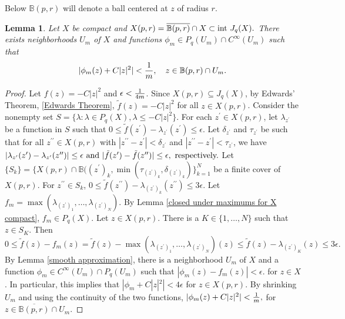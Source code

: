 \documentclass[12pt]{amsart}
\newtheorem{lem}[theorem]{Lemma}
\numberwithin{equation}{section}
{\theoremstyle{definition}
\newtheorem{remark}[theorem]{Remark}
}
\begin{document}
Below $\mathbb{B}(p, r)$ will denote a ball centered at $z$ of radius $r$.
\begin{lem}\label{A Pq function which is close on the Jensen boundary}
    Let $X$ be compact and
$
X(p, r) = \overline{\mathbb{B}(p, r)} \cap X \subset \hbox{int }J_q(X).
$
There exists neighborhoods $U_m$ of $X$ and functions $\phi_m \in P_q(U_m) \cap C^{\infty}(U_m)$ such that
$$
|\phi_m(z) + C|z|^2| < {1 \over m}, \quad z \in \mathbb{B}(p, r) \cap U_m.
$$
\end{lem}
\begin{proof}
Let $f(z) = -C|z|^2$ and $\epsilon < {1 \over 4m}$. Since $X(p, r) \subseteq J_q(X)$, by Edwards' Theorem, \eqref{Edwards Theorem}, 
$
\tilde{f}(z) = -C|z|^2$ for all $z \in X(p, r)$.
Consider the nonempty set
$
S = \{\lambda: \lambda \in P_q(X), \lambda \leq -C|z|^2\}.
$
For each $z^{\prime} \in X(p, r)$, let $\lambda_{z^{\prime}}$ be a function in $S$ such that
$
0 \leq \tilde{f}(z^{\prime}) - \lambda_{z^{\prime}}(z^{\prime}) \leq \epsilon.
$
 Let $\delta_{z^{\prime}}$ and $\tau_{z^{\prime}}$ be such that for all $z^{\prime\prime} \in X(p, r)$ with $|z^{\prime\prime} - z^{\prime}| < \delta_{z^{\prime}}$ and $|z^{\prime\prime} - z^{\prime}| < \tau_{z^{\prime}}$, we have 
    $
    |\lambda_{z^{\prime}}(z^{\prime}) - \lambda_{z^{\prime}}(z^{\prime\prime})| \leq \epsilon \hbox{ and }
    |\tilde{f}(z^{\prime}) - \tilde{f}(z^{\prime\prime})| \leq \epsilon, \hbox{ respectively.}
    $
    Let $\{S_k\} = \{X(p, r) \cap \mathbb{B}((z^{\prime})_k, \min(\tau_{(z^{\prime})_k}, \delta_{(z^{\prime})_k})\}_{k =1}^N$ be a finite cover of $X(p, r)$.  For $z^{\prime\prime} \in S_k$,
    $
    0 \leq \tilde{f}(z^{\prime\prime}) - \lambda_{(z^{\prime})_k}(z^{\prime\prime})  \leq 3\epsilon.
    $
    Let $f_{m} = \max(\lambda_{(z^{\prime})_1},\ldots,\lambda_{(z^{\prime})_N})$. By Lemma \ref{closed under maximums for X compact}, $f_{m} \in P_q(X)$.
    Let $z \in X(p, r)$.  There is a $K \in \{1, \ldots, N\}$ such that $z \in S_K$.  Then
    $$
    0 \leq \tilde{f}(z) - f_{m}(z) = \tilde{f}(z) - \max(\lambda_{(z^{\prime})_1},\ldots,\lambda_{(z^{\prime})_N})(z)  \leq \tilde{f}(z) - \lambda_{(z^{\prime})_K}(z) \leq 3\epsilon.
    $$
    By Lemma \ref{smooth approximation}, there is a neighborhood $U_m$ of $X$ and a function $\phi_m \in C^{\infty}(U_m)\cap P_q(U_m)$ such that 
    $
    |\phi_m(z) - f_m(z)| < \epsilon.
    $ for $z \in X$.
    In particular, this implies that 
    $
    |\phi_m + C|z|^2| < 4\epsilon$ for $z \in X(p, r).$
    By shrinking $U_m$ and using the continuity of the two functions,
    $
    |\phi_m(z) + C|z|^2| < {1 \over m},$ for $z \in \overline{\mathbb{B}(p, r)} \cap U_m.
    $
\end{proof}
\end{document}
